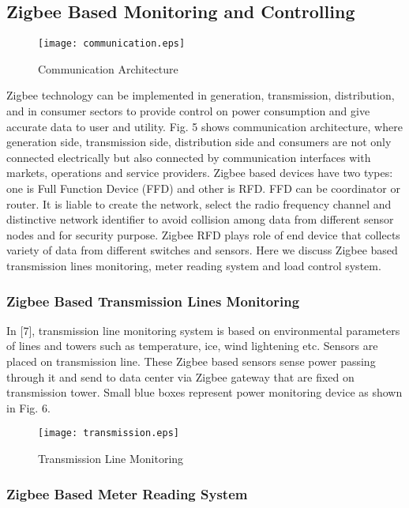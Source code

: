 \documentclass[10pt, conference, compsocconf]{IEEEtran}
\begin{document}
\subsection{Zigbee Based Monitoring and Controlling}

 \begin{figure*}[t]
\centering
  \texttt{[image: communication.eps]}
  \caption{Communication Architecture}
\end{figure*}

Zigbee technology can be implemented in generation, transmission, distribution, and in consumer sectors to provide control on power consumption and give accurate data to user and utility. Fig. 5 shows communication architecture, where generation side, transmission side, distribution side and consumers are not only connected electrically but also connected by communication interfaces with markets, operations and service providers. Zigbee based devices have two types: one is Full Function Device (FFD) and other is RFD. FFD can be coordinator or router. It is liable to create the network, select the radio frequency channel and distinctive network identifier to avoid collision among data from different sensor nodes and for security purpose. Zigbee RFD plays role of end device that collects variety of data from different switches and sensors. Here we discuss Zigbee based transmission lines monitoring, meter reading system and load control system.


\subsubsection{Zigbee Based Transmission Lines Monitoring}

In [7], transmission line monitoring system is based on environmental parameters of lines and towers such as temperature, ice, wind lightening etc. Sensors are placed on transmission line. These Zigbee based sensors sense power passing through it and send to data center via Zigbee gateway that are fixed on transmission tower. Small blue boxes represent power monitoring device as shown in Fig. 6.

\begin{figure*}[t]
\centering
  \texttt{[image: transmission.eps]}\\
  \caption{Transmission Line Monitoring}
\end{figure*}

\subsubsection{Zigbee Based Meter Reading System}
\end{document}
